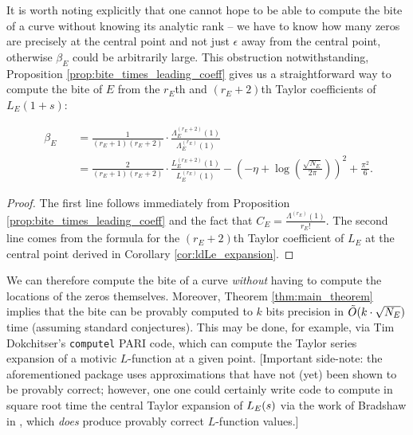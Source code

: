 It is worth noting explicitly that one cannot hope to be able to compute the bite of a curve without knowing its analytic rank -- we have to know how many zeros are precisely at the central point and not just $\epsilon$ away from the central point, otherwise $\beta_E$ could be arbitrarily large. This obstruction notwithstanding, Proposition \ref{prop:bite_times_leading_coeff} gives us a straightforward way to compute the bite of $E$ from the $r_E$th and $(r_E+2)$th Taylor coefficients of $L_E(1+s)$:
\begin{corollary}[GRH]
\begin{align}\
\beta_E \quad &= \frac{1}{(r_E+1)(r_E+2)} \cdot \frac{\Lambda_E^{(r_E+2)}(1)}{\Lambda_E^{(r_E)}(1)} \label{eqn:bite_via_Lams} \\
&= \frac{2}{(r_E+1)(r_E+2)} \cdot \frac{L_E^{(r_E+2)}(1)}{L_E^{(r_E)}(1)} - \left(-\eta+\log\left(\frac{\sqrt{N_E}}{2\pi}\right)\right)^2 + \frac{\pi^2}{6} \label{eqn:bite_via_L_E}.
\end{align}
\end{corollary}
\begin{proof}
The first line follows immediately from Proposition \ref{prop:bite_times_leading_coeff} and the fact that $C_E = \frac{\Lambda^{(r_E)}(1)}{r_E!}$. The second line comes from the formula for the $(r_E+2)$th Taylor coefficient of $L_E$ at the central point derived in Corollary \ref{cor:ldLe_expansion}.
\end{proof}
We can therefore compute the bite of a curve {\it without} having to compute the locations of the zeros themselves. Moreover, Theorem \ref{thm:main_theorem} implies that the bite can be provably computed to $k$ bits precision in $\tilde{O}(k\cdot \sqrt{N_E})$ time (assuming standard conjectures). This may be done, for example, via Tim Dokchitser's {\tt computel} PARI code, which can compute the Taylor series expansion of a motivic $L$-function at a given point. [Important side-note: the aforementioned package uses approximations that have not (yet) been shown to be provably correct; however, one one could certainly write code to compute in square root time the central Taylor expansion of $L_E(s)$ via the work of Bradshaw in \cite{Bra-2010}, which {\it does} produce provably correct $L$-function values.] \\


